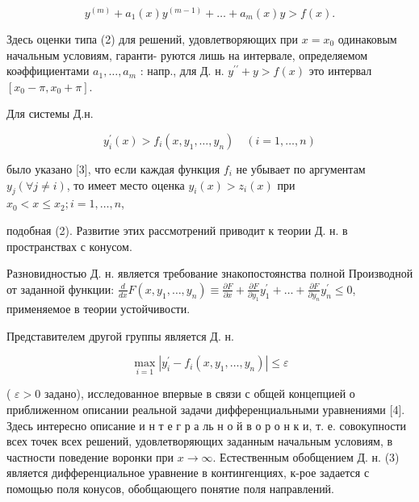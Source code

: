 \documentclass[10pt]{article}
\begin{document}
\[

y^{(m)}+a_{1}(x) y^{(m-1)}+\ldots+a_{m}(x) y>f(x) .

\]



Здесь оценки типа (2) для решений, удовлетворяющих при $x=x_{0}$ одинаковым начальным условиям, гаранти- руются лишь на интервале, определяемом коәффициентами $a_{1}, \ldots, a_{m}$ : напр., для Д. н. $y^{\prime \prime}+y>f(x)$ это интервал $\left[x_{0}-\pi, x_{0}+\pi\right]$.



Для системы Д.н.



\[

y_{i}^{\prime}(x)>f_{i}\left(x, y_{1}, \ldots, y_{n}\right) \quad(i=1, \ldots, n)

\]



было указано [3], что если каждая функция $f_{i}$ не убывает по аргументам $y_{j}(\forall j \neq i)$, то имеет место оценка $y_{i}(x)>z_{i}(x)$ при $x_{0}<x \leqslant x_{2} ; i=1, \ldots, n$,



подобная (2). Развитие этих рассмотрений приводит к теории Д. н. в пространствах с конусом.



Разновидностью Д. н. является требование знакопостоянства полной Производной от заданной функции: $\frac{d}{d x} F\left(x, y_{1}, \ldots, y_{n}\right) \equiv \frac{\partial F}{\partial x}+\frac{\partial F}{\partial y_{1}} y_{1}^{\prime}+\ldots+\frac{\partial F}{\partial y_{n}} y_{n}^{\prime} \leqslant 0$, применяемое в теории устойчивости.



Представителем другой группы является Д. н.



\[

\max _{i=1}\left|y_{i}^{\prime}-f_{i}\left(x, y_{1}, \ldots, y_{n}\right)\right| \leqslant \varepsilon

\]



( $\varepsilon>0$ задано), исследованное впервые в связи с общей концепцией о приближенном описании реальной задачи дифференциальными уравнениями [4]. Здесь интересно описание и н т е г р а ль н о й в о р о н к и, т. е. совокупности всех точек всех решений, удовлетворяющих заданным начальным условиям, в частности поведение воронки при $x \rightarrow \infty$. Естественным обобщением Д. н. (3) является дифференциальное уравнение в контингенциях, к-рое задается с помощью поля конусов, обобщающего понятие поля направлений.
\end{document}
